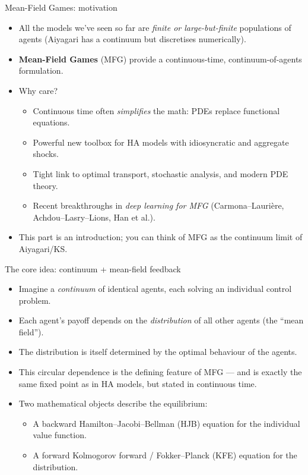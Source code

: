 \begin{frame}{Mean-Field Games: motivation}
\begin{itemize}
\item All the models we've seen so far are \emph{finite or large-but-finite} populations of agents (Aiyagari has a continuum but discretises numerically).
\medskip
\item \textbf{Mean-Field Games} (MFG) provide a continuous-time, continuum-of-agents formulation.
\medskip
\item Why care?
  \begin{itemize}
  \item Continuous time often \emph{simplifies} the math: PDEs replace functional equations.
  \item Powerful new toolbox for HA models with idiosyncratic and aggregate shocks.
  \item Tight link to optimal transport, stochastic analysis, and modern PDE theory.
  \item Recent breakthroughs in \emph{deep learning for MFG} (Carmona--Lauri\`ere, Achdou--Lasry--Lions, Han et al.).
  \end{itemize}
\medskip
\item This part is an introduction; you can think of MFG as the continuum limit of Aiyagari/KS.
\end{itemize}
\end{frame}

\begin{frame}{The core idea: continuum + mean-field feedback}
\begin{itemize}
\item Imagine a \emph{continuum} of identical agents, each solving an individual control problem.
\medskip
\item Each agent's payoff depends on the \emph{distribution} of all other agents (the ``mean field'').
\medskip
\item The distribution is itself determined by the optimal behaviour of the agents.
\medskip
\item This circular dependence is the defining feature of MFG --- and is exactly the same fixed point as in HA models, but stated in continuous time.
\medskip
\item Two mathematical objects describe the equilibrium:
  \begin{itemize}
  \item A backward Hamilton--Jacobi--Bellman (HJB) equation for the individual value function.
  \item A forward Kolmogorov forward / Fokker--Planck (KFE) equation for the distribution.
  \end{itemize}
\end{itemize}
\end{frame}

